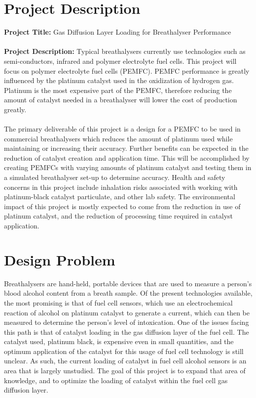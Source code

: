 \documentclass{article}
\begin{document}
	\section{Project Description}
		\textbf{Project Title:} Gas Diffusion Layer Loading for Breathalyser Performance \\ \\
		\textbf{Project Description: }
		Typical breathalysers currently use technologies such as semi-conductors, infrared and polymer electrolyte fuel cells. This project will focus on polymer electrolyte fuel cells (PEMFC). PEMFC performance is greatly influenced by the platinum catalyst used in the oxidization of hydrogen gas. Platinum is the most expensive part of the PEMFC, therefore reducing the amount of catalyst needed in a breathalyser will lower the cost of production greatly.\\ \\
		The primary deliverable of this project is a design for a PEMFC to be used in commercial breathalysers which reduces the amount of platinum used while maintaining or increasing their accuracy. Further benefits can be expected in the reduction of catalyst creation and application time. This will be accomplished by creating PEMFCs with varying amounts of platinum catalyst and testing them in a simulated breathalyser set-up to determine accuracy. Health and safety concerns in this project include inhalation risks associated with working with platinum-black catalyst particulate, and other lab safety. The environmental impact of this project is mostly expected to come from the reduction in use of platinum catalyst, and the reduction of processing time required in catalyst application.
	\section{Design Problem}
		Breathalysers are hand-held, portable devices that are used to measure a person's blood alcohol content from a breath sample. Of the present technologies available, the most promising is that of fuel cell sensors, which use an electrochemical reaction of alcohol on platinum catalyst to generate a current, which can then be measured to determine the person's level of intoxication. One of the issues facing this path is that of catalyst loading in the gas diffusion layer of the fuel cell. The catalyst used, platinum black, is expensive even in small quantities, and the optimum application of the catalyst for this usage of fuel cell technology is still unclear. As such, the current loading of catalyst in fuel cell alcohol sensors is an area that is largely unstudied. The goal of this project is to expand that area of knowledge, and to optimize the loading of catalyst within the fuel cell gas diffusion layer.
\end{document}

